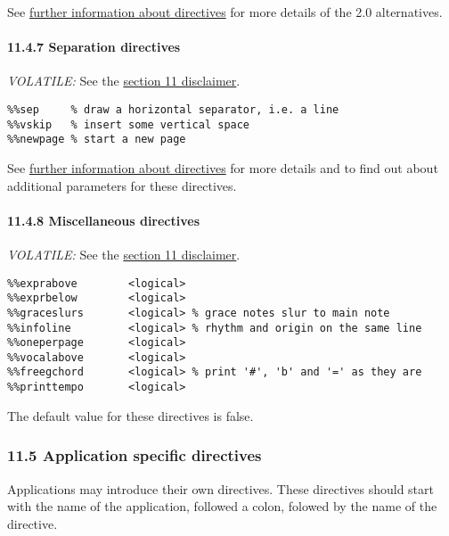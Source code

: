 See \protect\hyperlink{further_information_about_directives}{further
information about directives} for more details of the 2.0 alternatives.

\hypertarget{separation_directives}{\paragraph{11.4.7 Separation
directives}\label{separation_directives}}

\emph{VOLATILE:} See the \protect\hyperlink{disclaimer}{section 11
disclaimer}.

\begin{verbatim}
%%sep     % draw a horizontal separator, i.e. a line
%%vskip   % insert some vertical space
%%newpage % start a new page
\end{verbatim}

See \protect\hyperlink{further_information_about_directives}{further
information about directives} for more details and to find out about
additional parameters for these directives.

\hypertarget{miscellaneous_directives}{\paragraph{11.4.8 Miscellaneous
directives}\label{miscellaneous_directives}}

\emph{VOLATILE:} See the \protect\hyperlink{disclaimer}{section 11
disclaimer}.

\begin{verbatim}
%%exprabove        <logical>
%%exprbelow        <logical>
%%graceslurs       <logical> % grace notes slur to main note
%%infoline         <logical> % rhythm and origin on the same line
%%oneperpage       <logical>
%%vocalabove       <logical>
%%freegchord       <logical> % print '#', 'b' and '=' as they are
%%printtempo       <logical>
\end{verbatim}

The default value for these directives is false.

\hypertarget{application_specific_directives}{\subsubsection{11.5
Application specific directives}\label{application_specific_directives}}

Applications may introduce their own directives. These directives should
start with the name of the application, followed a colon, folowed by the
name of the directive.

